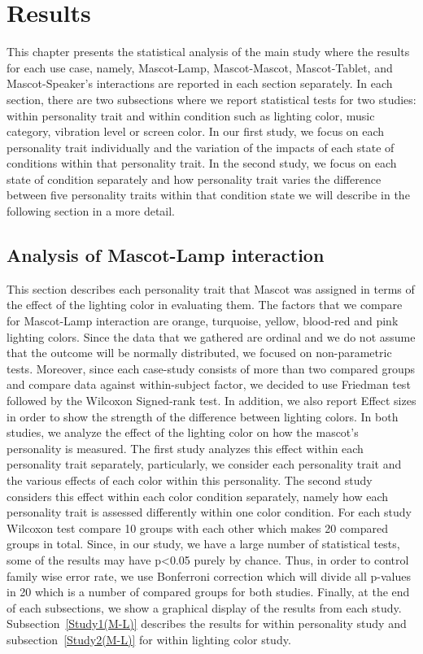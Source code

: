 \chapter{Results}
\label{Results}
This chapter presents the statistical analysis of the main study where the results for each use case, namely, Mascot-Lamp,
Mascot-Mascot, Mascot-Tablet, and Mascot-Speaker’s interactions are reported in each section separately.
In each section, there are two subsections where we report statistical tests for two studies: within personality trait
and within condition such as lighting color, music category, vibration level or screen color.
In our first study, we focus on each personality trait individually and the variation of the impacts of each state of
conditions within that personality trait. In the second study, we focus on each state of condition separately and how
personality trait varies the difference between five personality traits within that condition state we will describe in
the following section in a more detail.

\section{Analysis of Mascot-Lamp interaction}
\label{M-L}
This section describes each personality trait that Mascot was assigned in terms of the effect of the lighting color
in evaluating them. The factors that we compare for Mascot-Lamp interaction are orange, turquoise, yellow, blood-red
and pink lighting colors. Since the data that we gathered are ordinal and we do not assume that the outcome will be
normally distributed, we focused on non-parametric tests. Moreover, since each case-study consists of more than two
compared groups and compare data against within-subject factor, we decided to use Friedman test followed by the
Wilcoxon Signed-rank test. In addition, we also report Effect sizes in order to show the strength of the difference
between lighting colors. In both studies, we analyze the effect of the lighting color on how the mascot’s personality is measured.
The first study analyzes this effect within each personality trait separately, particularly, we consider each
personality trait and the various effects of each color within this personality. The second study considers this
effect within each color condition separately, namely how each personality trait is assessed differently within one
color condition. For each study Wilcoxon test compare 10 groups with each other which makes 20 compared groups in total.
Since, in our study, we have a large number of statistical tests, some of the results may have p<0.05 purely by chance.
Thus, in order to control family wise error rate, we use Bonferroni correction which will divide all p-values in 20 which
is a number of compared groups for both studies. Finally, at the end of each subsections, we show a graphical display of
the results from each study. Subsection~\ref{Study1(M-L)} describes the results for within personality study and
subsection~\ref{Study2(M-L)} for within lighting color study.

